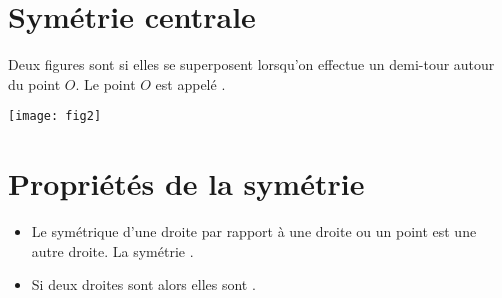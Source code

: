 \documentclass[xcolor={dvipsnames}]{beamer}
\begin{document}
\section{Symétrie centrale}


\begin{frame}
	\begin{mydef}
		
		Deux figures sont  si elles se superposent lorsqu'on effectue un demi-tour autour du point $O$. Le point $O$ est appelé .\pause
		
	\end{mydef}
	
	\begin{myex}
		\begin{center}
			\texttt{[image: fig2]}
		\end{center}
	\end{myex}
\end{frame}


\section{Propriétés de la symétrie}

\begin{frame}
	\begin{myprops}
		\begin{itemize}
			\item Le symétrique d'une droite par rapport à une droite ou un point est une autre droite. La symétrie .
			\item Si deux droites sont  alors elles sont .
		\end{itemize}
	\end{myprops}
\end{frame}
\end{document}
